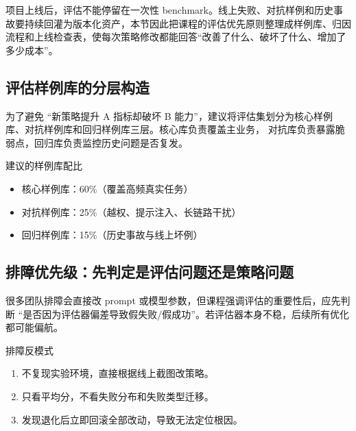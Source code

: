 \documentclass[a4paper]{article}
\begin{document}
项目上线后，评估不能停留在一次性 benchmark。线上失败、对抗样例和历史事故要持续回灌为版本化资产，本节因此把课程的评估优先原则整理成样例库、归因流程和上线检查表，使每次策略修改都能回答“改善了什么、破坏了什么、增加了多少成本”。

\subsection{评估样例库的分层构造}
为了避免 ``新策略提升 A 指标却破坏 B 能力''，建议将评估集划分为核心样例库、对抗样例库和回归样例库三层。核心库负责覆盖主业务， 对抗库负责暴露脆弱点，回归库负责监控历史问题是否复发。

\begin{knowledgebox}{建议的样例库配比}
\begin{itemize}
    \item 核心样例库：60\%（覆盖高频真实任务）
    \item 对抗样例库：25\%（越权、提示注入、长链路干扰）
    \item 回归样例库：15\%（历史事故与线上坏例）
\end{itemize}
\end{knowledgebox}

\subsection{排障优先级：先判定是评估问题还是策略问题}
很多团队排障会直接改 prompt 或模型参数，但课程强调评估的重要性后，应先判断 ``是否因为评估器偏差导致假失败/假成功''。若评估器本身不稳，后续所有优化都可能偏航。

\begin{warningbox}{排障反模式}
\begin{enumerate}
    \item 不复现实验环境，直接根据线上截图改策略。
    \item 只看平均分，不看失败分布和失败类型迁移。
    \item 发现退化后立即回滚全部改动，导致无法定位根因。
\end{enumerate}
\end{warningbox}
\end{document}
